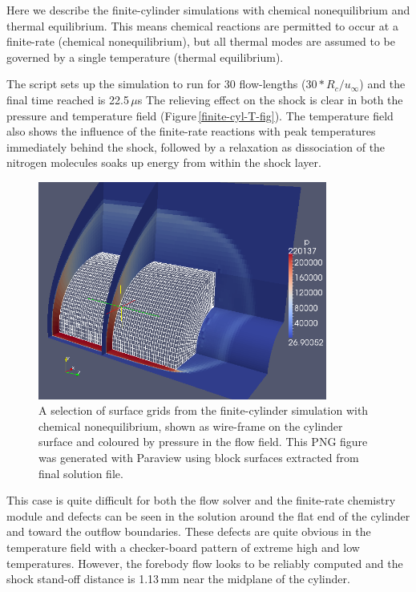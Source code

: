 \medskip
Here we describe the finite-cylinder simulations with chemical nonequilibrium and thermal equilibrium.
This means chemical reactions are permitted to occur at a finite-rate (chemical nonequilibrium), but all thermal modes 
are assumed to be governed by a single temperature (thermal equilibrium).

\medskip
The script sets up the simulation to run for 30 flow-lengths ($30 * R_c / u_{\infty}$)
and the final time reached is 22.5\,$\mu$s
The relieving effect on the shock is clear in both the pressure and temperature field (Figure\,\ref{finite-cyl-T-fig}).
The temperature field also shows the influence of the finite-rate reactions with peak temperatures immediately
behind the shock, followed by a relaxation as dissociation of the nitrogen molecules soaks up energy from within the 
shock layer.
 
\begin{figure}[htbp]
\begin{center}
\includegraphics[width=9.5cm]{../3D/finite-cylinder/thermal-eq/finite-cyl-p-with-mesh-aug2010.png}
\end{center}
\caption{A selection of surface grids from the finite-cylinder simulation with chemical nonequilibrium, 
   shown as wire-frame on the cylinder surface
   and coloured by pressure in the flow field.
   This PNG figure was generated with Paraview using block surfaces extracted from final solution file.}
\label{finite-cyl-p-fig}
\end{figure}

\medskip
This case is quite difficult for both the flow solver and the finite-rate chemistry module
and defects can be seen in the solution around the flat end of the cylinder and toward the
outflow boundaries.
These defects are quite obvious in the temperature field with a checker-board pattern of
extreme high and low temperatures.
However, the forebody flow looks to be reliably computed and the shock stand-off distance is
1.13\,mm near the midplane of the cylinder.

